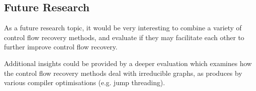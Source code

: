 \documentclass[12pt, a4paper]{article}
\begin{document}

\subsection{Future Research}

As a future research topic, it would be very interesting to combine a variety of control flow recovery methods, and evaluate if they may facilitate each other to further improve control flow recovery.

Additional insights could be provided by a deeper evaluation which examines how the control flow recovery methods deal with irreducible graphs, as produces by various compiler optimisations (e.g. jump threading).

\clearpage


\end{document}
